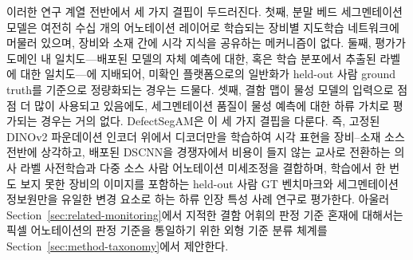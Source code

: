 이러한 연구 계열 전반에서 세 가지 결핍이 두드러진다. 첫째, 분말 베드
세그멘테이션 모델은 여전히 수십 개의 어노테이션 레이어로 학습되는 장비별
지도학습 네트워크에 머물러 있으며, 장비와 소재 간에 시각 지식을 공유하는
메커니즘이 없다. 둘째, 평가가 도메인 내 일치도---배포된 모델의 자체 예측에
대한, 혹은 학습 분포에서 추출된 라벨에 대한 일치도---에 지배되어, 미확인
플랫폼으로의 일반화가 held-out 사람 ground truth를 기준으로 정량화되는
경우는 드물다. 셋째, 결함 맵이 물성 모델의 입력으로 점점 더 많이 사용되고
있음에도, 세그멘테이션 품질이 물성 예측에 대한 하류 가치로 평가되는 경우는
거의 없다. DefectSegAM은 이 세 가지 결핍을 다룬다. 즉, 고정된
DINOv2 파운데이션 인코더 위에서 디코더만을 학습하여 시각 표현을 장비--소재
소스 전반에 상각하고, 배포된 DSCNN을 경쟁자에서 비용이 들지 않는 교사로
전환하는 의사 라벨 사전학습과 다중 소스 사람 어노테이션 미세조정을
결합하며, 학습에서 한 번도 보지 못한 장비의 이미지를 포함하는 held-out 사람
GT 벤치마크와 세그멘테이션 정보원만을 유일한 변경 요소로 하는 하류 인장
특성 사례 연구로 평가한다. 아울러
Section~\ref{sec:related-monitoring}에서 지적한 결함 어휘의 판정 기준
혼재에 대해서는 픽셀 어노테이션의 판정 기준을 통일하기 위한 외형 기준
분류 체계를 Section~\ref{sec:method-taxonomy}에서 제안한다.
